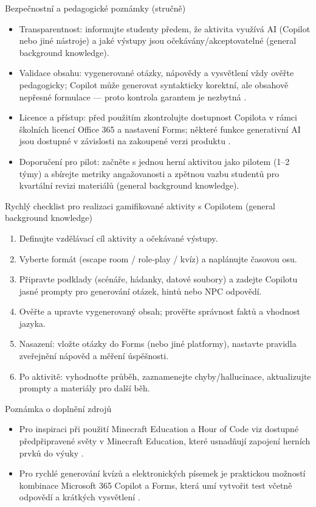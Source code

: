 Bezpečnostní a pedagogické poznámky (stručně)
\begin{itemize}
  \item Transparentnost: informujte studenty předem, že aktivita využívá AI (Copilot nebo jiné nástroje) a jaké výstupy jsou očekávány/akceptovatelné (general background knowledge).
  \item Validace obsahu: vygenerované otázky, nápovědy a vysvětlení vždy ověřte pedagogicky; Copilot může generovat syntakticky korektní, ale obsahově nepřesné formulace — proto kontrola garantem je nezbytná \cite{kb_ai_101_tipu_pdf_04e4a115_page_36_1}.
  \item Licence a přístup: před použitím zkontrolujte dostupnost Copilota v rámci školních licencí Office 365 a nastavení Forms; některé funkce generativní AI jsou dostupné v závislosti na zakoupené verzi produktu \cite{kb_ai_101_tipu_pdf_04e4a115_page_3_1}.
  \item Doporučení pro pilot: začněte s jednou herní aktivitou jako pilotem (1–2 týmy) a sbírejte metriky angažovanosti a zpětnou vazbu studentů pro kvartální revizi materiálů (general background knowledge).
\end{itemize}

Rychlý checklist pro realizaci gamifikované aktivity s Copilotem (general background knowledge)
\begin{enumerate}
  \item Definujte vzdělávací cíl aktivity a očekávané výstupy.
  \item Vyberte formát (escape room / role‑play / kvíz) a naplánujte časovou osu.
  \item Připravte podklady (scénáře, hádanky, datové soubory) a zadejte Copilotu jasné prompty pro generování otázek, hintů nebo NPC odpovědí.
  \item Ověřte a upravte vygenerovaný obsah; prověřte správnost faktů a vhodnost jazyka.
  \item Nasazení: vložte otázky do Forms (nebo jiné platformy), nastavte pravidla zveřejnění nápověd a měření úspěšnosti.
  \item Po aktivitě: vyhodnoťte průběh, zaznamenejte chyby/hallucinace, aktualizujte prompty a materiály pro další běh.
\end{enumerate}

Poznámka o doplnění zdrojů
\begin{itemize}
  \item Pro inspiraci při použití Minecraft Education a Hour of Code viz dostupné předpřipravené světy v Minecraft Education, které usnadňují zapojení herních prvků do výuky \cite{kb_ai_101_tipu_pdf_04e4a115_page_15_2}.
  \item Pro rychlé generování kvízů a elektronických písemek je praktickou možností kombinace Microsoft 365 Copilot a Forms, která umí vytvořit test včetně odpovědí a krátkých vysvětlení \cite{kb_ai_101_tipu_pdf_04e4a115_page_36_1}.
\end{itemize}